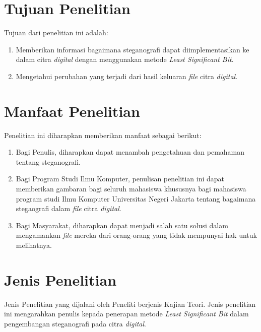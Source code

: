 \section{Tujuan Penelitian}
Tujuan dari penelitian ini adalah: 
\begin{enumerate}
	\item Memberikan informasi bagaimana steganografi dapat diimplementasikan ke dalam citra \emph{digital} dengan menggunakan metode \emph{Least Significant Bit}. 
	\item Mengetahui perubahan yang terjadi dari hasil keluaran \emph{file} citra \emph{digital}.
\end{enumerate}

\section{Manfaat Penelitian}
Penelitian ini diharapkan memberikan manfaat sebagai berikut:
	\begin{enumerate}
		\item Bagi Penulis, diharapkan dapat menambah pengetahuan dan pemahaman tentang steganografi.
		\item Bagi Program Studi Ilmu Komputer, penulisan penelitian ini dapat memberikan gambaran bagi seluruh mahasiswa khususnya bagi mahasiswa program studi Ilmu Komputer Universitas Negeri Jakarta tentang bagaimana stegaografi dalam \emph{file} citra \emph{digital}.
		\item Bagi Masyarakat, diharapkan dapat menjadi salah satu solusi dalam mengamankan \emph{file} mereka dari orang-orang yang tidak mempunyai hak untuk melihatnya.   	
	\end{enumerate}

\section{Jenis Penelitian}
Jenis Penelitian yang dijalani oleh Peneliti berjenis Kajian Teori. Jenis penelitian ini mengarahkan penulis kepada penerapan metode \emph{Least Significant Bit} dalam pengembangan steganografi pada citra \emph{digital}.		
\begin{comment}

\end{comment}
